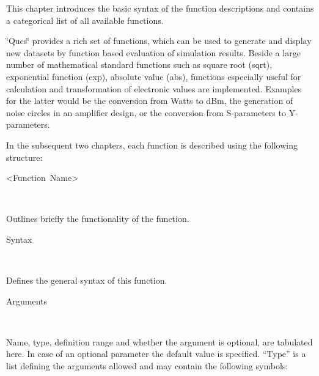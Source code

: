 \providecommand{\boldsymbol}[1]{\mbox{\boldmath $#1$}}

\providecommand{\tabularnewline}{\\}

This chapter introduces the basic syntax of the function descriptions
and contains a categorical list of all available functions.


\char`\"{}Qucs\char`\"{} provides a rich set of functions, which can
be used to generate and display new datasets by function based evaluation
of simulation results. Beside a large number of mathematical standard
functions such as square root (sqrt), exponential function (exp),
absolute value (abs), functions especially useful for calculation
and transformation of electronic values are implemented. Examples
for the latter would be the conversion from Watts to dBm, the generation
of noise circles in an amplifier design, or the conversion from S-parameters
to Y-parameters.



In the subsequent two chapters, each function is described using the
following structure: 

\begin{description}
\item [<Function~Name>]~
\end{description}
Outlines briefly the functionality of the function.

\begin{description}
\item [Syntax]~
\end{description}
Defines the general syntax of this function.

\begin{description}
\item [Arguments]~
\end{description}
Name, type, definition range and whether the argument is optional,
are tabulated here. In case of an optional parameter the default value
is specified. {}``Type'' is a list defining the arguments allowed
and may contain the following symbols:
\medskip{}

